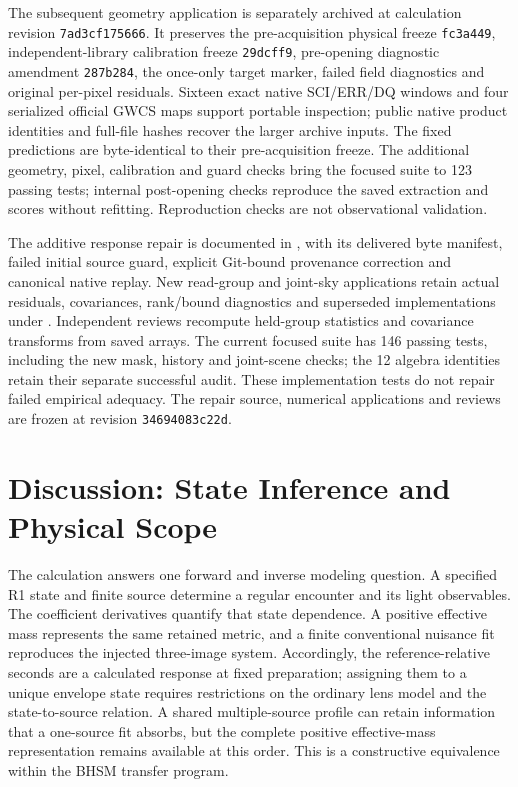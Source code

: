 The subsequent geometry application is separately archived at calculation
revision \texttt{7ad3cf175666}. It preserves the pre-acquisition physical
freeze \texttt{fc3a449}, independent-library calibration freeze
\texttt{29dcff9}, pre-opening diagnostic amendment \texttt{287b284},
the once-only target marker, failed field diagnostics and original
per-pixel residuals. Sixteen exact native SCI/ERR/DQ windows and four
serialized official GWCS maps support portable inspection; public
native product identities and full-file hashes recover the larger
archive inputs. The fixed predictions are byte-identical to their
pre-acquisition freeze. The additional geometry, pixel, calibration and
guard checks bring the focused suite to 123 passing tests; internal
post-opening checks reproduce the saved extraction and scores without
refitting. Reproduction checks are not observational validation.

The additive response repair is documented in
, with its
delivered byte manifest, failed initial source guard, explicit
Git-bound provenance correction and canonical native replay. New
read-group and joint-sky applications retain actual residuals,
covariances, rank/bound diagnostics and superseded implementations
under .
Independent reviews recompute held-group statistics and covariance
transforms from saved arrays. The current focused suite has 146 passing
tests, including the new mask, history and joint-scene checks; the
12 algebra identities retain their separate successful audit.
These implementation tests do not repair failed empirical adequacy.
The repair source, numerical applications and reviews are frozen at
revision \texttt{34694083c22d}.

\section{Discussion: State Inference and Physical Scope}
\label{sec:discussion}
The calculation answers one forward and inverse modeling question.
A specified R1 state and finite source determine a regular encounter
and its light observables. The coefficient derivatives quantify that
state dependence. A positive effective mass represents the same
retained metric, and a finite conventional nuisance fit reproduces the
injected three-image system. Accordingly, the reference-relative
seconds are a calculated response at fixed preparation; assigning them
to a unique envelope state requires restrictions on the ordinary lens
model and the state-to-source relation. A shared multiple-source profile
can retain information that a one-source fit absorbs, but the complete
positive effective-mass representation remains available at this order.
This is a constructive equivalence within the BHSM transfer program.

